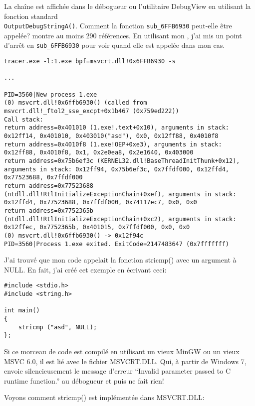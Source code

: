 La chaîne est affichée dans le débogueur ou l'utilitaire DebugView en utilisant
la fonction standard\\
\verb|OutputDebugStringA()|.
Comment la fonction \verb|sub_6FFB6930| peut-elle être appelée?
\IDA montre au moins 290 références.
En utilisant mon \tracer, j'ai mis un point d'arrêt en \verb|sub_6FFB6930| pour
voir quand elle est appelée dans mon cas.

\begin{lstlisting}
tracer.exe -l:1.exe bpf=msvcrt.dll!0x6FFB6930 -s

...

PID=3560|New process 1.exe
(0) msvcrt.dll!0x6ffb6930() (called from msvcrt.dll!_ftol2_sse_excpt+0x1b467 (0x759ed222))
Call stack:
return address=0x401010 (1.exe!.text+0x10), arguments in stack: 0x12ff14, 0x401010, 0x403010("asd"), 0x0, 0x12ff88, 0x4010f8
return address=0x4010f8 (1.exe!OEP+0xe3), arguments in stack: 0x12ff88, 0x4010f8, 0x1, 0x2e0ea8, 0x2e1640, 0x403000
return address=0x75b6ef3c (KERNEL32.dll!BaseThreadInitThunk+0x12), arguments in stack: 0x12ff94, 0x75b6ef3c, 0x7ffdf000, 0x12ffd4, 0x77523688, 0x7ffdf000
return address=0x77523688 (ntdll.dll!RtlInitializeExceptionChain+0xef), arguments in stack: 0x12ffd4, 0x77523688, 0x7ffdf000, 0x74117ec7, 0x0, 0x0
return address=0x7752365b (ntdll.dll!RtlInitializeExceptionChain+0xc2), arguments in stack: 0x12ffec, 0x7752365b, 0x401015, 0x7ffdf000, 0x0, 0x0
(0) msvcrt.dll!0x6ffb6930() -> 0x12f94c
PID=3560|Process 1.exe exited. ExitCode=2147483647 (0x7fffffff)
\end{lstlisting}

J'ai trouvé que mon code appelait la fonction stricmp() avec un argument à NULL.
En fait, j'ai créé cet exemple en écrivant ceci:

\begin{lstlisting}[style=customc]
#include <stdio.h>
#include <string.h>

int main()
{
	stricmp ("asd", NULL);
};
\end{lstlisting}

Si ce morceau de code est compilé en utilisant un vieux MinGW ou un vieux MSVC 6.0,
il est lié avec le fichier MSVCRT.DLL.
Qui, à partir de Windows 7, envoie silencieusement le message d'erreur ``Invalid
parameter passed to C runtime function.'' au débogueur et puis ne fait rien!

Voyons comment stricmp() est implémentée dans MSVCRT.DLL:

